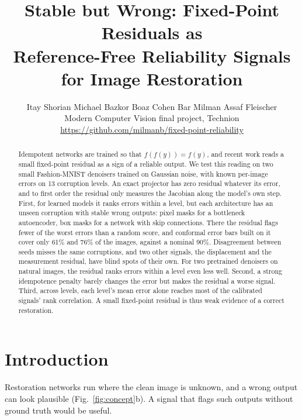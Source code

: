 \documentclass[10pt,twocolumn,a4paper]{article}
\title{Stable but Wrong: Fixed-Point Residuals as\\Reference-Free Reliability Signals for Image Restoration}
\author{Itay Shorian \quad Michael Bazkor \quad Boaz Cohen \quad Bar Milman \quad Assaf Fleischer\\[2pt]
  \small Modern Computer Vision final project, Technion\\
  \small\url{https://github.com/milmanb/fixed-point-reliability}}
\date{}
\begin{document}
\maketitle

\begin{abstract}
Idempotent networks are trained so that $f(f(y)) = f(y)$, and recent work reads a small
fixed-point residual as a sign of a reliable output. We test this reading on two small
Fashion-MNIST denoisers trained on Gaussian noise, with known per-image errors on 13 corruption
levels. An exact projector has zero residual whatever its error, and to first order the residual
only measures the Jacobian along the model's own step. First, for learned models it ranks errors
within a level, but each architecture has an unseen corruption with stable wrong outputs: pixel
masks for a bottleneck autoencoder, box masks for a network with skip connections. There the
residual flags fewer of the worst errors than a random score, and conformal error bars built on it
cover only 61\% and 76\% of the images, against a nominal 90\%. Disagreement between seeds misses
the same corruptions, and two other signals, the displacement and the measurement residual, have
blind spots of their own. For two pretrained denoisers on natural images, the residual ranks errors
within a level even less well. Second, a strong idempotence penalty barely changes the error but
makes the residual a worse signal. Third, across levels, each level's mean error alone reaches most
of the calibrated signals' rank correlation. A small fixed-point residual is thus weak evidence of a
correct restoration.
\end{abstract}

\section{Introduction}

Restoration networks run where the clean image is unknown, and a wrong output can look plausible
(Fig.~\ref{fig:concept}b). A signal that flags such outputs without ground truth would be useful.
\end{document}
